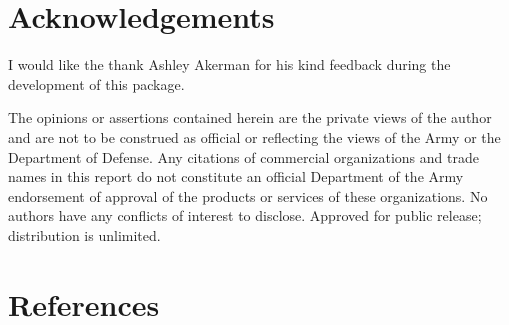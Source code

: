 \documentclass[
]{article}
\begin{document}
\hypertarget{acknowledgements}{%
\section{Acknowledgements}\label{acknowledgements}}

I would like the thank Ashley Akerman for his kind feedback during the
development of this package.

The opinions or assertions contained herein are the private views of the
author and are not to be construed as official or reflecting the views
of the Army or the Department of Defense. Any citations of commercial
organizations and trade names in this report do not constitute an
official Department of the Army endorsement of approval of the products
or services of these organizations. No authors have any conflicts of
interest to disclose. Approved for public release; distribution is
unlimited.

\hypertarget{references}{%
\section*{References}\label{references}}
\end{document}
